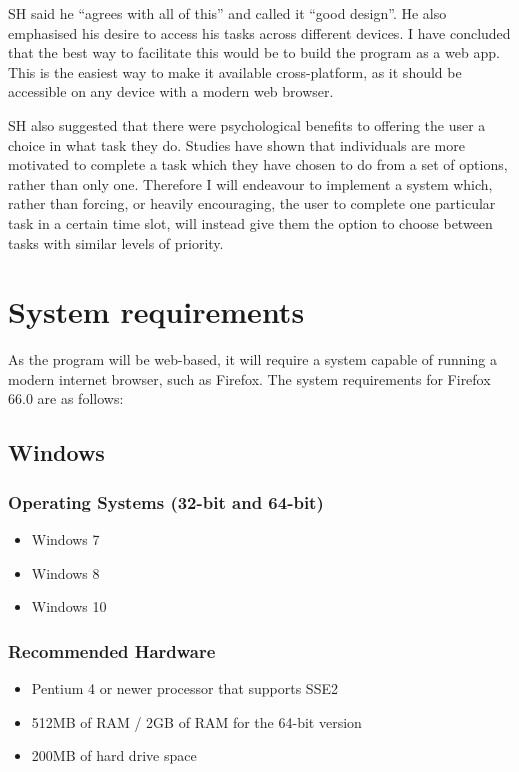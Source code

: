 \documentclass{article}
\begin{document}
SH said he ``agrees with all of this'' and called it ``good design''. He also
emphasised his desire to access his tasks across different devices. I have
concluded that the best way to facilitate this would be to build the program as
a web app. This is the easiest way to make it available cross-platform, as it
should be accessible on any device with a modern web browser.

SH also suggested that there were psychological benefits to offering the user a
choice in what task they do. Studies have shown that individuals are more
motivated to complete a task which they have chosen to do from a set of options,
rather than only one. Therefore I will endeavour to implement a system which,
rather than forcing, or heavily encouraging, the user to complete one particular
task in a certain time slot, will instead give them the option to choose between
tasks with similar levels of priority.

\section{System requirements}
As the program will be web-based, it will require a system capable of running a
modern internet browser, such as Firefox. The system requirements for Firefox
66.0 are as follows:

\subsection*{Windows}\label{windows}

\subsubsection*{Operating Systems (32-bit and
  64-bit)}\label{operating-systems-32-bit-and-64-bit}

\begin{itemize}
\item Windows 7
\item Windows 8
\item Windows 10
\end{itemize}

\subsubsection*{Recommended Hardware}\label{recommended-hardware}

\begin{itemize}
\item Pentium 4 or newer processor that supports SSE2
\item 512MB of RAM / 2GB of RAM for the 64-bit version
\item 200MB of hard drive space
\end{itemize}
\end{document}
